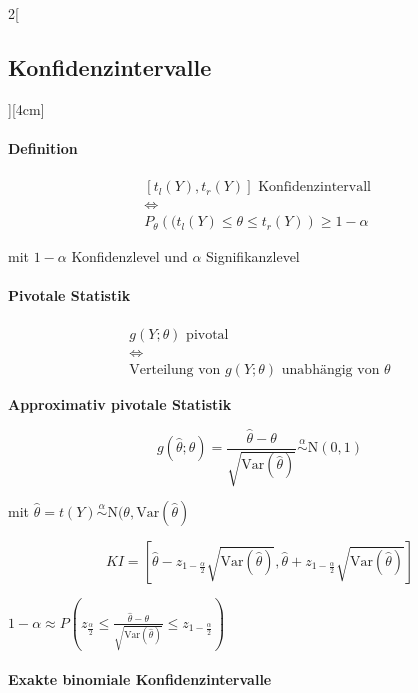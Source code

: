\documentclass[8pt]{extarticle}
\begin{document}
\begin{multicols}{2}[\subsection{Konfidenzintervalle}][4cm]

\paragraph{Definition}
$$\begin{gathered}
\left[t_l(Y),t_r(Y)\right] \text{ Konfidenzintervall } \\
\Leftrightarrow \\
P_\theta\left((t_l(Y) \leq \theta \leq t_r(Y)\right) \geq 1-\alpha
\end{gathered}$$


\noindent mit $1-\alpha$ Konfidenzlevel und $\alpha$ Signifikanzlevel

\paragraph{Pivotale Statistik}

$$\begin{gathered}
g(Y;\theta) \text{ pivotal}\\
\Leftrightarrow \\
\text{Verteilung von } g(Y;\theta) \text{ unabhängig von } \theta
\end{gathered}$$

\textbf{Approximativ pivotale Statistik}

$$g(\hat{\theta};\theta) = \frac{\hat{\theta} - \theta}{\sqrt{\textrm{Var}(\hat{\theta})}} \overset{\alpha}{\sim} \mathrm{N}(0,1)$$

mit $\hat{\theta} = t(Y) \overset{\alpha}{\sim} \mathrm{N}(\theta,\mathrm{Var}(\hat{\theta})$

$$KI = \left[ \hat{\theta} - z_{1-\frac{\alpha}{2}}\sqrt{\mathrm{Var}(\hat{\theta})}, \hat{\theta} + z_{1-\frac{\alpha}{2}}\sqrt{\mathrm{Var}(\hat{\theta})} \right]$$

\begin{Beweis}
$1-\alpha \approx P \left( z_{\frac{\alpha}{2}} \leq \frac{\hat{\theta} - \theta}{\sqrt{\textrm{Var}(\hat{\theta})}} \leq z_{1-\frac{\alpha}{2}}\right)$
\end{Beweis}

\paragraph{Exakte binomiale Konfidenzintervalle}

\end{multicols}
\end{document}
